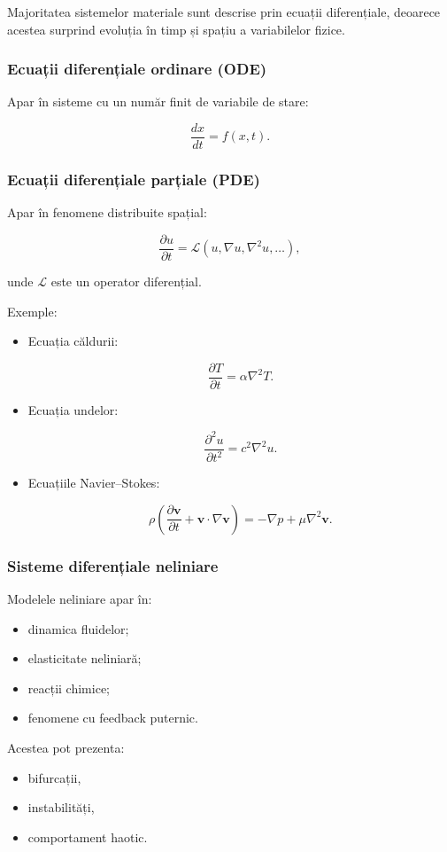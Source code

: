 \documentclass[12pt,a4paper]{article}
\begin{document}
Majoritatea sistemelor materiale sunt descrise prin ecuații diferențiale, deoarece acestea surprind evoluția în timp și spațiu a variabilelor fizice.

\subsubsection*{Ecuații diferențiale ordinare (ODE)}
Apar în sisteme cu un număr finit de variabile de stare:


\[
\frac{dx}{dt} = f(x,t).
\]



\subsubsection*{Ecuații diferențiale parțiale (PDE)}
Apar în fenomene distribuite spațial:


\[
\frac{\partial u}{\partial t} = \mathcal{L}(u, \nabla u, \nabla^2 u, \ldots),
\]


unde $\mathcal{L}$ este un operator diferențial.

Exemple:
\begin{itemize}
    \item Ecuația căldurii:
    

\[
    \frac{\partial T}{\partial t} = \alpha \nabla^2 T.
    \]


    \item Ecuația undelor:
    

\[
    \frac{\partial^2 u}{\partial t^2} = c^2 \nabla^2 u.
    \]


    \item Ecuațiile Navier–Stokes:
    

\[
    \rho \left( \frac{\partial \mathbf{v}}{\partial t} + \mathbf{v}\cdot\nabla \mathbf{v} \right)
    = -\nabla p + \mu \nabla^2 \mathbf{v}.
    \]


\end{itemize}

\subsubsection*{Sisteme diferențiale neliniare}

Modelele neliniare apar în:
\begin{itemize}
    \item dinamica fluidelor;
    \item elasticitate neliniară;
    \item reacții chimice;
    \item fenomene cu feedback puternic.
\end{itemize}

Acestea pot prezenta:
\begin{itemize}
    \item bifurcații,
    \item instabilități,
    \item comportament haotic.
\end{itemize}
\end{document}
